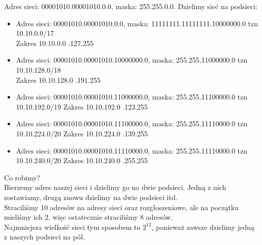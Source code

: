 \documentclass[a4paper]{article}
\begin{document}
Adres sieci: 00001010.00001010.0.0, maska: 255.255.0.0. Dzielimy sieć na podsieci:\\
\begin{itemize}
\item Adres sieci: 00001010.00001010.0.0, maska: 11111111.11111111.10000000.0 tzn 10.10.0.0/17\\
Zakres 10.10.0.0 .127.255
\item Adres sieci: 00001010.00001010.10000000.0, maska: 255.255.11000000.0 tzn 10.10.128.0/18\\
Zakres 10.10.128.0 .191.255
\item Adres sieci: 00001010.00001010.11000000.0, maska: 255.255.11100000.0 tzn 10.10.192.0/19
Zakres 10.10.192.0 .123.255
\item Adres sieci: 00001010.00001010.11100000.0, maska: 255.255.11110000.0 tzn 10.10.224.0/20
Zakres 10.10.224.0 .139.255
\item Adres sieci: 00001010.00001010.11110000.0, maska: 255.255.11110000.0 tzn 10.10.240.0/20
Zakres 10.10.240.0 .255.255
\end{itemize}
Co robimy?\\
Bierzemy adres naszej sieci i dzielimy go na dwie podsieci. Jedną z nich zostawiamy, drugą znowu dzielimy na dwie podsieci itd.\\
Straciliśmy 10 adresów na adresy sieci oraz rozgłoszeniowe, ale na początku mieliśmy ich 2, więc ostatecznie straciliśmy 8 adresów.\\
Najmniejsza wielkość sieci tym sposobem to \begin{math}2^{12}\end{math}, ponieważ zawsze dzielimy jedną z naszych podsieci na pół.
\end{document}
